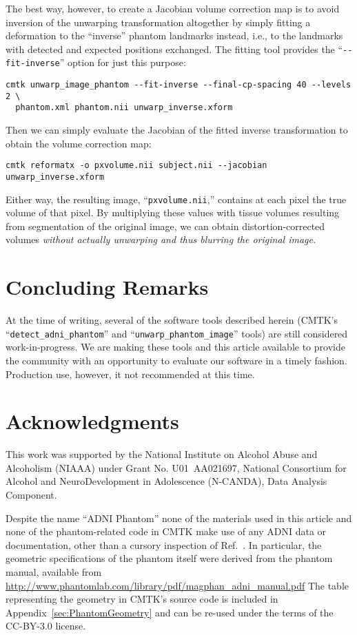 \documentclass{InsightArticle}
\begin{document}
The best way, however, to create a Jacobian volume correction map is to avoid
inversion of the unwarping transformation altogether by simply fitting a
deformation to the ``inverse'' phantom landmarks instead, i.e., to the
landmarks with detected and expected positions exchanged. The fitting tool
provides the ``\verb|--fit-inverse|'' option for just this purpose:
\begin{verbatim}
cmtk unwarp_image_phantom --fit-inverse --final-cp-spacing 40 --levels 2 \
  phantom.xml phantom.nii unwarp_inverse.xform
\end{verbatim} 
Then we can simply evaluate the Jacobian of the fitted inverse transformation
to obtain the volume correction map:
\begin{verbatim}
cmtk reformatx -o pxvolume.nii subject.nii --jacobian unwarp_inverse.xform
\end{verbatim}


Either way, the resulting image, ``\texttt{pxvolume.nii},'' contains at each
pixel the true volume of that pixel. By multiplying these values with tissue
volumes resulting from segmentation of the original image, we can obtain
distortion-corrected volumes {\em without actually unwarping and thus blurring
the original image.}

\section{Concluding Remarks}

At the time of writing, several of the software tools described herein (CMTK's
``\texttt{detect\_adni\_phantom}'' and ``\texttt{unwarp\_phantom\_image}''
tools) are still considered work-in-progress. We are making these tools and
this article available to provide the community with an opportunity to
evaluate our software in a timely fashion. Production use, however, it not
recommended at this time.

\section*{Acknowledgments}

This work was supported by the National Institute on Alcohol Abuse and
Alcoholism (NIAAA) under Grant No. U01~AA021697, National Consortium for
Alcohol and NeuroDevelopment in Adolescence (N-CANDA), Data Analysis
Component.

Despite the name ``ADNI Phantom'' none of the materials used in this article
and none of the phantom-related code in CMTK make use of any ADNI data or
documentation, other than a cursory inspection of
Ref.~\cite{GuntBernBoro:2009}. In particular, the geometric specifications of
the phantom itself were derived from the phantom manual, available from
\url{http://www.phantomlab.com/library/pdf/magphan_adni_manual.pdf} The table
representing the geometry in CMTK's source code is included in
Appendix~\ref{sec:PhantomGeometry} and can be re-used under the terms of the
CC-BY-3.0 license.
\end{document}
